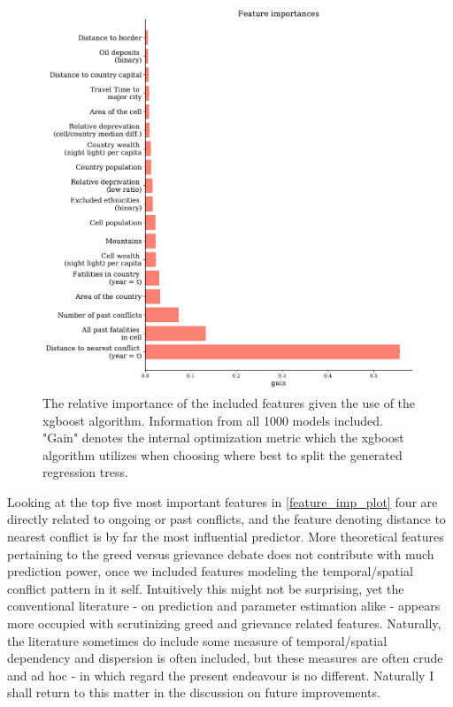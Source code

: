 \documentclass[a4paper]{article}
\begin{document}
\begin{figure}[!htb]
	\centering
	\includegraphics[scale=0.5]{feature_imp.pdf}
    \caption{\footnotesize{The relative importance of the included features given the use of the xgboost algorithm. Information from all 1000 models included. "Gain" denotes the internal optimization metric which the xgboost algorithm utilizes when choosing where best to split the generated regression tress.}}\label{feature_imp_plot}
\end{figure}

Looking at the top five most important features in \autoref{feature_imp_plot} four are directly related to ongoing or past conflicts, and the feature denoting distance to nearest conflict is by far the most influential predictor. More theoretical features pertaining to the greed versus grievance debate does not contribute with much prediction power, once we included features modeling the temporal/spatial conflict pattern in it self. Intuitively this might not be surprising, yet the conventional literature - on prediction and parameter estimation alike - appears more occupied with scrutinizing greed and grievance related features. Naturally, the literature sometimes do include some measure of temporal/spatial dependency and dispersion is often included, but these measures are often crude and ad hoc - in which regard the present endeavour is no different. Naturally I shall return to this matter in the discussion on future improvements.\par
\end{document}
